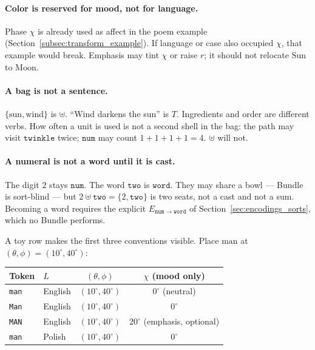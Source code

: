 \documentclass[12pt, a4paper]{article}
\begin{document}
\paragraph{Color is reserved for mood, not for language.}
Phase $\chi$ is already used as affect in the poem example
(Section~\ref{subsec:transform_example}). If language or case also
occupied $\chi$, that example would break. Emphasis may tint $\chi$
or raise $r$; it should not relocate $\mathrm{Sun}$ to $\mathrm{Moon}$.

\paragraph{A bag is not a sentence.}
$\{\mathrm{sun},\mathrm{wind}\}$ is $\uplus$.
``Wind darkens the sun'' is $T$. Ingredients and order are different
verbs. How often a unit is used is not a second shell in the bag:
the path may visit $\texttt{twinkle}$ twice; $\mathtt{num}$ may
count $1+1+1+1=4$. $\uplus$ will not.

\paragraph{A numeral is not a word until it is cast.}
The digit $2$ stays $\mathtt{num}$. The word $\texttt{two}$ is
$\mathtt{word}$. They may share a bowl --- Bundle is sort-blind ---
but $2\uplus\texttt{two}=\{2,\texttt{two}\}$ is two seats, not a cast
and not a sum. Becoming a word requires the explicit
$E_{\mathtt{num}\to\mathtt{word}}$ of
Section~\ref{sec:encodings_sorts}, which no Bundle performs.

A toy row makes the first three conventions visible. Place
$\mathrm{man}$ at $(\theta,\phi)=(10^\circ,40^\circ)$:

\begin{center}
\begin{tabular}{llcc}
Token & $L$ & $(\theta,\phi)$ & $\chi$ (mood only) \\
\hline
\texttt{man} & English & $(10^\circ,40^\circ)$ & $0^\circ$ (neutral) \\
\texttt{Man} & English & $(10^\circ,40^\circ)$ & $0^\circ$ \\
\texttt{MAN} & English & $(10^\circ,40^\circ)$ & $20^\circ$ (emphasis, optional) \\
\texttt{man} & Polish  & $(10^\circ,40^\circ)$ & $0^\circ$ \\
\end{tabular}
\end{center}
\end{document}
